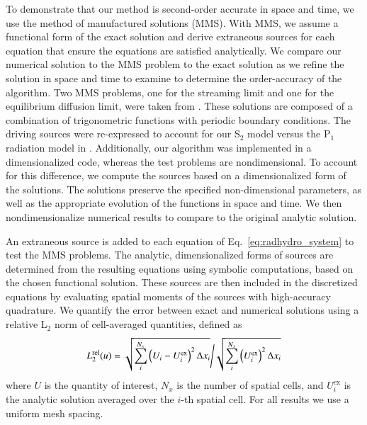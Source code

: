 \documentclass[preprint,12pt]{elsarticle}
\begin{document}
To demonstrate that our method is second-order accurate in space and time, we use the method of manufactured solutions (MMS).    
With MMS, we assume a functional form of the exact solution and  derive extraneous sources for each equation that ensure the
equations are satisfied analytically.  We compare our numerical solution to the MMS problem to the exact solution as we refine the
solution in space and time to examine to determine the order-accuracy of the algorithm.  
Two MMS problems, one for the streaming limit and one for the equilibrium diffusion limit, were taken from \cite{mcclarren2}.  These
solutions are composed of a combination of trigonometric functions with periodic boundary
conditions.  The driving sources were re-expressed 
to account for our  S$_2$ model versus the P$_1$ radiation model in \cite{mcclarren2}. Additionally, our algorithm was implemented in a
dimensionalized code, whereas the test problems are nondimensional. To account for this
difference, we compute the sources based on a dimensionalized form of the solutions.  The
solutions preserve the specified non-dimensional parameters, as well as the appropriate
evolution of the functions in space and time.  We then
nondimensionalize numerical results to compare to the original analytic solution.

An extraneous source is added
to each equation of Eq.~\eqref{eq:radhydro_system} to test the MMS problems. The analytic,
dimensionalized forms of  sources are determined from the resulting equations using symbolic computations, based on the chosen functional solution.
These sources are then included in the discretized equations by evaluating spatial moments of the sources with high-accuracy quadrature. 
We quantify the error between exact and numerical solutions using a relative L$_2$ norm of cell-averaged quantities, defined as
\begin{equation}
    \left.  L^{\mathrm{rel}}_2(u) = \sqrt{\sum\limits_i^{N_x} \left(U_i - U_i^{\text{ex}} \right)^2 \Delta x_i} \middle / 
    \sqrt{\sum\limits_i^{N_x} \left(U_i^{\text{ex}}\right)^2 \Delta x_i}  \right.
\end{equation}
where $U$ is the quantity of interest, $N_x$ is the number of spatial cells, and $U_i^{\text{ex}}$ is the analytic solution
averaged over the $i$-th spatial cell.  For all results we use a uniform mesh spacing.
\end{document}

